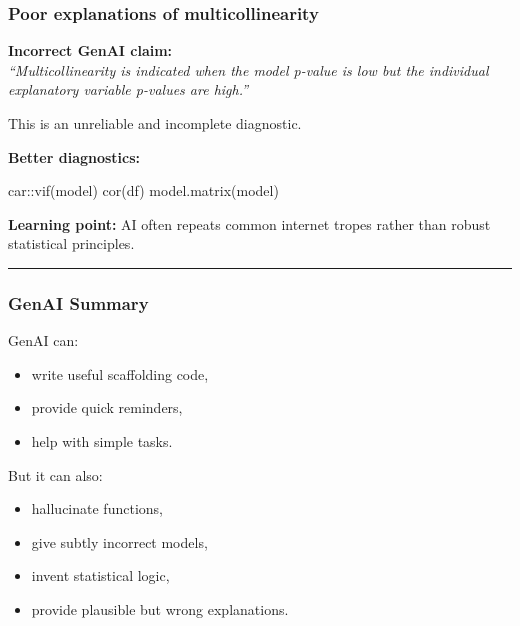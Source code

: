 \documentclass[
  letterpaper,
  8pt,
  a4paper]{book}
\newenvironment{Shaded}{\begin{snugshade}}{\end{snugshade}}
\newcommand{\FunctionTok}[1]{\textcolor[rgb]{0.28,0.35,0.67}{#1}}
\newcommand{\NormalTok}[1]{\textcolor[rgb]{0.00,0.23,0.31}{#1}}
\newcommand{\SpecialCharTok}[1]{\textcolor[rgb]{0.37,0.37,0.37}{#1}}
\providecommand{\tightlist}{%
  \setlength{\itemsep}{0pt}\setlength{\parskip}{0pt}}
\begin{document}
\subsubsection*{Poor explanations of
multicollinearity}\label{poor-explanations-of-multicollinearity}

\textbf{Incorrect GenAI claim:}\\
\emph{``Multicollinearity is indicated when the model p-value is low but
the individual explanatory variable p-values are high.''}

This is an unreliable and incomplete diagnostic.

\textbf{Better diagnostics:}

\begin{Shaded}
\begin{Highlighting}[]
\NormalTok{car}\SpecialCharTok{::}\FunctionTok{vif}\NormalTok{(model)}
\FunctionTok{cor}\NormalTok{(df)}
\FunctionTok{model.matrix}\NormalTok{(model)}
\end{Highlighting}
\end{Shaded}

\textbf{Learning point:} AI often repeats common internet tropes rather
than robust statistical principles.

\begin{center}\rule{0.5\linewidth}{0.5pt}\end{center}

\subsubsection*{GenAI Summary}\label{genai-summary}

GenAI can:

\begin{itemize}
\tightlist
\item
  write useful scaffolding code,\\
\item
  provide quick reminders,\\
\item
  help with simple tasks.
\end{itemize}

But it can also:

\begin{itemize}
\tightlist
\item
  hallucinate functions,\\
\item
  give subtly incorrect models,\\
\item
  invent statistical logic,\\
\item
  provide plausible but wrong explanations.
\end{itemize}
\end{document}
